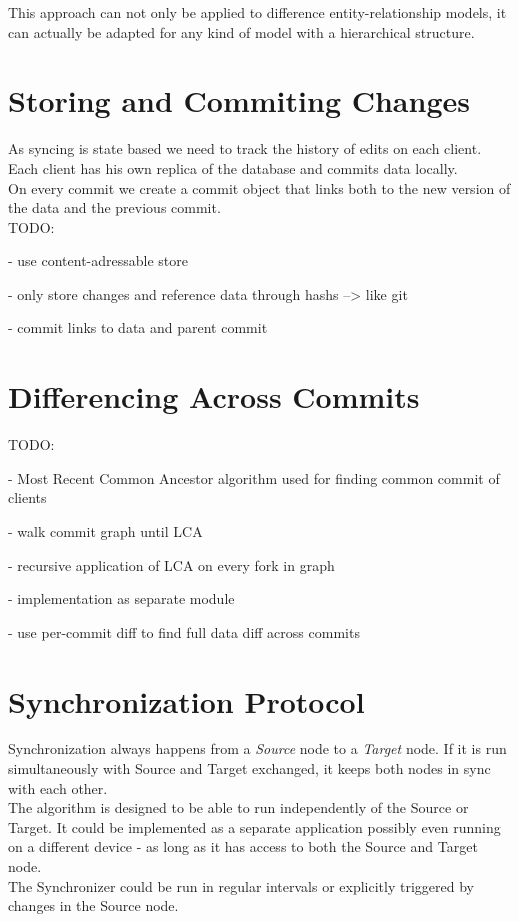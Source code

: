 This approach can not only be applied to difference entity-relationship models, it can actually be adapted for any kind of model with a hierarchical structure. 

\section{Storing and Commiting Changes}
\label{main.committing}
As syncing is state based we need to track the history of edits on each client.\\Each client has his own replica of the database and commits
data locally.\\On every commit we create a commit object that links both
to the new version of the data and the previous commit.\\

TODO:

- use content-adressable store

- only store changes and reference  data through hashs --> like git

- commit links to data and parent commit

\section{Differencing Across Commits}
\label{main.diff-across-commits}

TODO:

- Most Recent Common Ancestor algorithm used for finding common commit of clients

- walk commit graph until LCA

- recursive application of LCA on every fork in graph

- implementation as separate module

- use per-commit diff to find full data diff across commits

\section{Synchronization Protocol}
\label{sec:main.protocol}
Synchronization always happens from a \emph{Source} node to a \emph{Target} node.
If it is run simultaneously with Source and Target exchanged, it keeps both nodes in sync with each other.\\
The algorithm is designed to be able to run independently of the Source or Target.
It could be implemented as a separate application possibly even running on a different device - as long as it has access to both the Source and Target node.\\
The Synchronizer could be run in regular intervals or explicitly triggered by changes in the Source node.\\

